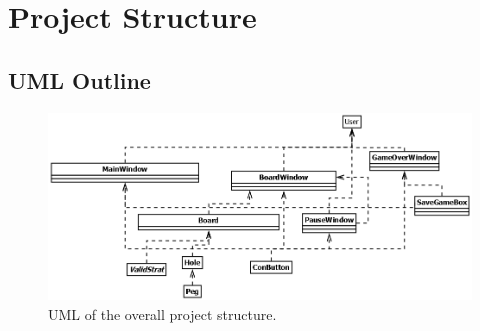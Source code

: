 \documentclass[10pt,conference,onecolumn,compsoc]{IEEEtran}
\begin{document}
\section{Project Structure}


\subsection{UML Outline}

\begin{figure}[H]
    \begin{center}
        \includegraphics[width=.75\linewidth]{uml.png}
        \caption{UML of the overall project structure.}
        \label{fig:umlstructure}
    \end{center}
\end{figure}



\end{document}
